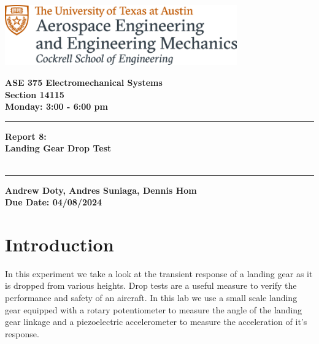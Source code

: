 \documentclass{article}
\begin{document}
\begin{titlepage}
  \centering
  \includegraphics[width=10cm]{ase-logo-formal.png}  %
  \vspace{1cm}  %
 
  \Large \textbf{ASE 375 Electromechanical Systems}\\
  \large \textbf{Section 14115}\\
  \vspace{0.5cm}
  \textbf{Monday: 3:00 - 6:00 pm}\\
 
  \vspace{1cm}
 
  \hrule
  \vspace{0.5cm}
 
  \Huge \textbf{Report 8:\\
    Landing Gear Drop Test}\\
  \Huge \textbf{}\\
 
  \vspace{0.5cm}
  \hrule
 
  \vspace{1cm}
 
  \normalsize \textbf{Andrew Doty, Andres Suniaga, Dennis Hom}\\
  \normalsize \textbf{Due Date: 04/08/2024}
 
\end{titlepage}
\newpage

\tableofcontents
\thispagestyle{empty}
\newpage

\section{Introduction}
In this experiment we take a look at the transient response of a landing gear as it is dropped from various heights. Drop tests are a useful measure to verify the performance and safety of an aircraft. In this lab we use a small scale landing gear equipped with a rotary potentiometer to measure the angle of the landing gear linkage and a piezoelectric accelerometer to measure the acceleration of it's response.
\vspace{2.5mm}
\end{document}

